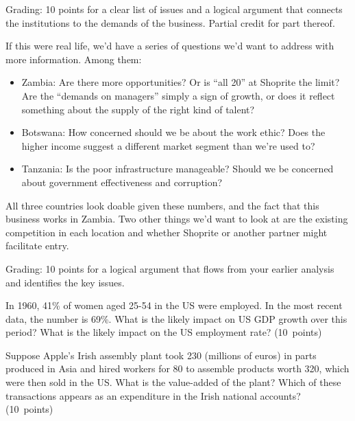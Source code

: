 \documentclass[letterpaper,12pt]{exam}
\begin{document}
\begin{questions}
\begin{solution}
\begin{parts}
Grading:  10 points for a clear list of issues and
a logical argument that connects
the institutions to the demands of the business.
Partial credit for part thereof.

\item If this were real life, we'd have a series of questions we'd want to address
with more information.
Among them:
\begin{itemize}
\item Zambia:  Are there more opportunities?
Or is ``all 20'' at Shoprite the limit?
Are the ``demands on managers'' simply a sign of growth,
or does it reflect something about the supply of the right kind of talent?

\item Botswana:  How concerned should we be about the work ethic?
Does the higher income suggest a different market segment than we're used to?

\item Tanzania:  Is the poor infrastructure manageable?
Should we be concerned about government effectiveness and corruption?
\end{itemize}
All three countries look doable given these numbers,
and the fact that this business works in Zambia.
Two other things we'd want to look at are
the existing competition in each location and whether
Shoprite or another partner might facilitate entry.

Grading:  10 points for a logical argument
that flows from your earlier analysis and identifies the key issues.
\end{parts}
\end{solution}

%
\begin{parts}
\item In 1960, 41\% of women aged 25-54 in the US were employed.
In the most recent data, the number is 69\%.
What is the likely impact on US GDP growth over this period?
What is the likely impact on the US employment rate?
(10~points)

\item Suppose Apple's Irish assembly plant
took 230 (millions of euros)
in parts produced in Asia and hired workers for 80
to assemble products worth 320, which were then sold  in the US.
What is the value-added of the plant?
Which of these transactions appears as an expenditure
in the Irish national accounts?
(10~points)


\end{parts}
\end{questions}
\end{document}
